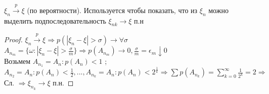\begin{example}
$\xi_{n}\xrightarrow{p} \xi$ (по вероятности). Используется чтобы показать, что из $\xi_{n}$ можно выделить подпоследовательность $\xi_{nk}\rightarrow \xi$ п.н
\end{example}
\begin{proof}
$\xi_{n}\xrightarrow{p} \xi \Rightarrow p(|\xi_{n}-\xi|>\sigma)\rightarrow \forall \sigma$\\
$A_{n_{m}}=\{\omega:|\xi_{n}-\xi|>\frac{\sigma}{m}\} \Rightarrow p(A_{n_{m}})\rightarrow 0, \frac{\sigma}{m}=\epsilon_{m}\downarrow 0$\\
Возьмем $A_{n_{1}}=A_{n}:p(A_{n})<1$ ; $A_{n_{2}}=A_{n}:p(A_{n})<\frac{1}{2},...,A_{n_{k}}=A_{n}:p(A_{n})<2^{\frac{1}{k}}\Rightarrow \sum\limits p(A_{n_{k}}) = \sum\limits_{k=0}^{\infty} \frac{1}{2^{k}} = 2 \Rightarrow $ Сл. $\Rightarrow \xi_{n_{k}}\rightarrow \xi$ п.н.
\end{proof}
